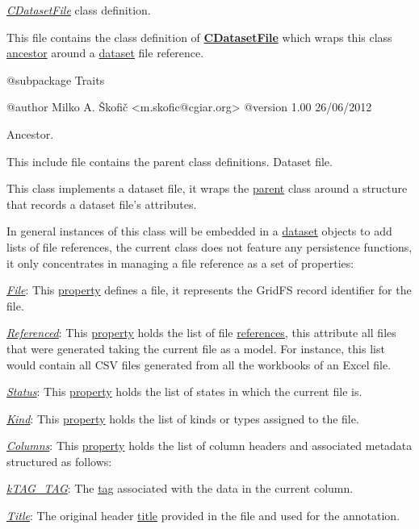 {\itshape \hyperlink{class_c_dataset_file}{C\-Dataset\-File}} class definition.

This file contains the class definition of {\bfseries \hyperlink{class_c_dataset_file}{C\-Dataset\-File}} which wraps this class \hyperlink{class_c_array_object}{ancestor} around a \hyperlink{class_c_dataset}{dataset} file reference.

\begin{DoxyVerb} @subpackage        Traits

 @author            Milko A. Škofič <m.skofic@cgiar.org>
 @version   1.00 26/06/2012\end{DoxyVerb}


Ancestor.

This include file contains the parent class definitions. Dataset file.

This class implements a dataset file, it wraps the \hyperlink{class_c_array_object}{parent} class around a structure that records a dataset file's attributes.

In general instances of this class will be embedded in a \hyperlink{class_c_dataset}{dataset} objects to add lists of file references, the current class does not feature any persistence functions, it only concentrates in managing a file reference as a set of properties\-:


\begin{DoxyItemize}
\item {\itshape \hyperlink{}{File}}\-: This \hyperlink{}{property} defines a file, it represents the Grid\-F\-S record identifier for the file. 
\item {\itshape \hyperlink{}{Referenced}}\-: This \hyperlink{}{property} holds the list of file \hyperlink{}{references}, this attribute all files that were generated taking the current file as a model. For instance, this list would contain all C\-S\-V files generated from all the workbooks of an Excel file. 
\item {\itshape \hyperlink{}{Status}}\-: This \hyperlink{}{property} holds the list of states in which the current file is. 
\item {\itshape \hyperlink{}{Kind}}\-: This \hyperlink{}{property} holds the list of kinds or types assigned to the file. 
\item {\itshape \hyperlink{}{Columns}}\-: This \hyperlink{}{property} holds the list of column headers and associated metadata structured as follows\-: 
\begin{DoxyItemize}
\item {\itshape \hyperlink{}{k\-T\-A\-G\-\_\-\-T\-A\-G}}\-: The \hyperlink{class_c_ontology_tag}{tag} associated with the data in the current column. 
\item {\itshape \hyperlink{}{Title}}\-: The original header \hyperlink{}{title} provided in the file and used for the annotation. 
\end{DoxyItemize}
\end{DoxyItemize}

